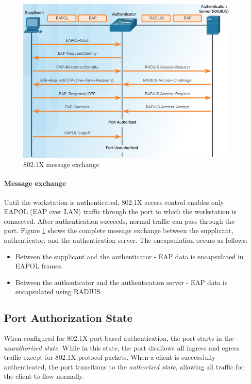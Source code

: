 \begin{figure}[hbtp]
\caption{802.1X message exchange}\label{MessageExchange}
\centering
\includegraphics[scale=0.7]{pictures/MessageExchange.PNG}
\end{figure}

\paragraph{Message exchange} Until the workstation is authenticated, 802.1X access control enables only EAPOL (EAP over LAN) traffic through the port to which the workstation is connected. After authentication succeeds, normal traffic can pass through the port. Figure \ref{MessageExchange} shows the complete message exchange between the supplicant, authenticator, and the authentication server. The encapsulation occurs as follows:

\begin{itemize}
\item Between the supplicant and the authenticator - EAP data is encapsulated in EAPOL frames.
\item Between the authenticator and the authentication server - EAP data is encapsulated using RADIUS.
\end{itemize}

\subsection{Port Authorization State}

When configured for 802.1X port-based authentication, the port starts in the \emph{unauthorized state}. While in this state, the port disallows all ingress and egress traffic except for 802.1X protocol packets. When a client is successfully authenticated, the port transitions to the \emph{authorized state}, allowing all traffic for the client to flow normally. \\

